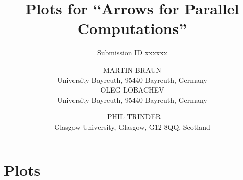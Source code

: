 \documentclass{jfp1}
\title{Plots for \enquote{Arrows for Parallel Computations}}
\author{Submission ID xxxxxx}
\author[M. Braun, O. Lobachev and P. Trinder]%
        {MARTIN BRAUN\\
         University Bayreuth, 95440 Bayreuth, Germany\\
		 OLEG LOBACHEV\\
		 University Bayreuth, 95440 Bayreuth, Germany\\
		 \and\ PHIL TRINDER\\
		 Glasgow University, Glasgow, G12 8QQ, Scotland}
\begin{document}
\label{firstpage}

\def\SymbReg{\textsuperscript{\textregistered}}

\maketitle

\tableofcontents

\section{Plots}

\newlength{\plotwidthDist}
\setlength{\plotwidthDist}{0.6\textwidth}
\newlength{\plotwidthSMP}
\setlength{\plotwidthSMP}{0.39\textwidth}

\newcommand{\meanOverheadPlot}[5]{
\begin{tikzpicture}
\begin{axis}[title={#1},
title style={align=center},
scale only axis, width=\plotwidthDist,
xlabel=Threads,
ytick distance=#2 / 4,
xtick distance=#3,
minor tick num=9,
ylabel=Overhead (\%),
ylabel near ticks,
grid=both,
legend entries={Mean Overhead},
legend style={at={(0.99,0.99)},anchor=north east},
max space between ticks=50pt,
grid style={line width=.1pt, draw=gray!10},
major grid style={line width=.2pt,draw=gray!50},
ymin=-#2,
ymax=#2,
xmin=-1,
xmax=#4]
\addplot+[mark=*,very thick,error bars/.cd,
    y dir=both,y explicit] table [x="nCores", y="overhead", y error="stdDevForOverhead", col sep=comma, mark=dots,
smooth]{#5};
\end{axis}
\end{tikzpicture}
}

\newcommand{\speedupplot}[8]{
\begin{tikzpicture}
\begin{axis}[title={#1},
title style={align=center},
scale only axis, width=#7,
xlabel=Threads,
xtick distance=#4,
ytick distance=#4,
ylabel=Speedup,
ylabel near ticks,
grid=major,
legend entries={linear, #2},
legend style={at={(0.01,0.99)},anchor=north west},
max space between ticks=50pt,
grid style={line width=.1pt, draw=gray!10},
major grid style={line width=.2pt,draw=gray!50},
ymin=-1,
xmin=-1,
ymax=#8,
xmax=#6]
\addplot [domain=0:#3, no markers,dotted,thick]{x};
#5
\end{axis}
\end{tikzpicture}
}

\newcommand{\rmtest}{Rabin--Miller test\xspace}
\newcommand{\sudokutest}{Sudoku\xspace}
\newcommand{\jacobitest}{Jacobi sum test\xspace}
\newcommand{\torustest}{Gentleman\xspace}
\end{document}
